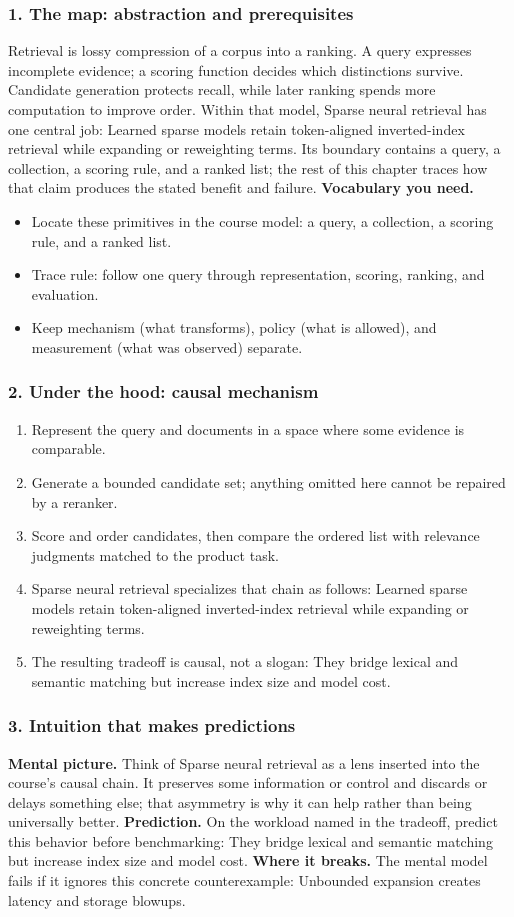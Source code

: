 \subsubsection*{1. The map: abstraction and prerequisites}
Retrieval is lossy compression of a corpus into a ranking. A query expresses incomplete evidence; a scoring function decides which distinctions survive. Candidate generation protects recall, while later ranking spends more computation to improve order.
Within that model, Sparse neural retrieval has one central job: Learned sparse models retain token-aligned inverted-index retrieval while expanding or reweighting terms. Its boundary contains a query, a collection, a scoring rule, and a ranked list; the rest of this chapter traces how that claim produces the stated benefit and failure.
\textbf{Vocabulary you need.}\begin{itemize}
\item Locate these primitives in the course model: a query, a collection, a scoring rule, and a ranked list.
\item Trace rule: follow one query through representation, scoring, ranking, and evaluation.
\item Keep mechanism (what transforms), policy (what is allowed), and measurement (what was observed) separate.
\end{itemize}
\subsubsection*{2. Under the hood: causal mechanism}\begin{enumerate}
\item Represent the query and documents in a space where some evidence is comparable.
\item Generate a bounded candidate set; anything omitted here cannot be repaired by a reranker.
\item Score and order candidates, then compare the ordered list with relevance judgments matched to the product task.
\item Sparse neural retrieval specializes that chain as follows: Learned sparse models retain token-aligned inverted-index retrieval while expanding or reweighting terms.
\item The resulting tradeoff is causal, not a slogan: They bridge lexical and semantic matching but increase index size and model cost.
\end{enumerate}
\subsubsection*{3. Intuition that makes predictions}
\textbf{Mental picture.} Think of Sparse neural retrieval as a lens inserted into the course's causal chain. It preserves some information or control and discards or delays something else; that asymmetry is why it can help rather than being universally better.
\textbf{Prediction.} On the workload named in the tradeoff, predict this behavior before benchmarking: They bridge lexical and semantic matching but increase index size and model cost.
\textbf{Where it breaks.} The mental model fails if it ignores this concrete counterexample: Unbounded expansion creates latency and storage blowups.
